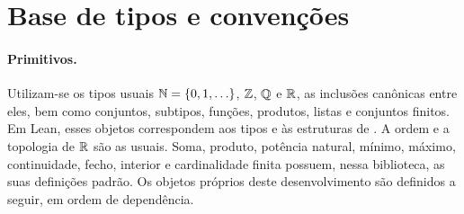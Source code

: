 


\renewcommand{\abstractname}{Resumo}
\begin{abstract}
Fixam-se os tipos e as dependências de todas as construções empregadas na
normalização de montagens diádicas. Definem-se as representações por
átomos e por células endereçadas, as conversões entre elas, as classes de
funções, os orçamentos e os erros em um reticulado completo. Demonstram-se
a normalização por células ativas e a equivalência entre as três
formulações, com os mesmos limites de folhas e de altura. A ordenação
finita, a cadeia de nós e a extensão ReLU recebem construções explícitas.
As operações recursivas incluem medidas de término e casos iniciais.
\end{abstract}
\renewcommand{\abstractname}{Abstract}
\begin{abstract}
We fix the types and dependencies of all constructions used in the normalization of dyadic assemblies. We define the representations by atoms and by addressed cells, their conversions, the function classes, and the budgets and errors in a complete lattice. We prove normalization by active cells and the equivalence of the three formulations with the same leaf and height bounds. The finite ordering, the node chain, and the ReLU extension receive explicit constructions. The recursive operations include termination measures and base cases.
\end{abstract}
\renewcommand{\abstractname}{Resumo}

\section{Base de tipos e convenções}
\label{normalizacao:sec:base}

\paragraph{Primitivos.}
Utilizam-se os tipos usuais $\mathbb N=\{0,1,\ldots\}$, $\mathbb Z$, $\mathbb Q$ e $\mathbb R$,
as inclusões canônicas entre eles, bem como conjuntos, subtipos, funções,
produtos, listas e conjuntos finitos. Em Lean, esses objetos correspondem
aos tipos e às estruturas de . A ordem e a topologia de $\mathbb R$
são as usuais. Soma, produto, potência natural, mínimo, máximo,
continuidade, fecho, interior e cardinalidade finita possuem, nessa
biblioteca, as suas definições padrão. Os objetos próprios deste
desenvolvimento são definidos a seguir, em ordem de dependência.


